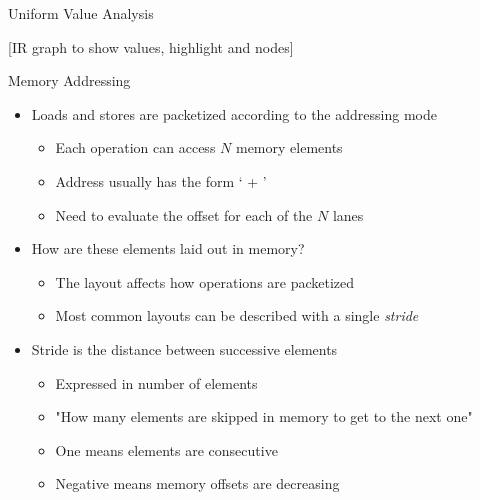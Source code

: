 
\begin{frame}[c]{Uniform Value Analysis}

[IR graph to show values, highlight  and  nodes]

\end{frame}


\begin{frame}{Memory Addressing}

\begin{itemize}
    \item Loads and stores are packetized according to the addressing mode
    \begin{itemize}
        \item Each operation can access $N$ memory elements
        \item Address usually has the form ` + '
        \item Need to evaluate the offset for each of the $N$ lanes
    \end{itemize}
    
    \item How are these elements laid out in memory?
    \begin{itemize}
        \item The layout affects how operations are packetized
        \item Most common layouts can be described with a single \emph{stride}
    \end{itemize}
    
    \item Stride is the distance between successive elements
    \begin{itemize}
        \item Expressed in number of elements
        \item "How many elements are skipped in memory to get to the next one"
        \item One means elements are consecutive
        \item Negative means memory offsets are decreasing
    \end{itemize}
    
    
\end{itemize}

\end{frame}


